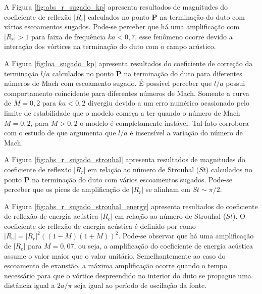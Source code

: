 \begin{figure}[ht!]
  \centering
  
\end{figure}

A Figura \ref{fig:abs_r_sugado_kp} apresenta resultados de magnitudes do coeficiente de reflexão $|R_{r}|$ calculados no ponto $\textbf{P}$ na terminação do duto com vários escoamentos sugados. Pode-se perceber que há uma amplificação com $|R_{r}| > 1$ para faixa de frequência $ka < 0,7$, esse fenômeno ocorre devido a interação dos vórtices na terminação do duto com o campo acústico.

A Figura \ref{fig:loa_sugado_kp} apresenta resultados do coeficiente de correção da terminação $l/a$ calculados no ponto $\textbf{P}$ na terminação do duto para diferentes números de Mach com escoamento sugado. É possível perceber que $l/a$ possui comportamento coincidente para diferentes números de Mach. Somente a curva de $M = 0,2$ para $ka < 0,2$ divergiu devido a um erro numérico ocasionado pelo limite de estabilidade que o modelo começa a ter quando o número de Mach $M = 0,2$, para $M > 0,2$ o modelo é completamente instável. Tal fato corrobora com o estudo de  que argumenta que $l/a$ é insensível a variação do número de Mach.  

\begin{figure}[ht!]
  \centering
  
\end{figure}

\begin{figure}[ht!]
\centering
  
\end{figure}

 A Figura \ref{fig:abs_r_sugado_strouhal} apresenta resultados de magnitudes do coeficiente de reflexão $|R_{r}|$ em relação ao número de Strouhal ($St$) calculados no ponto $\textbf{P}$ na terminação do duto com vários escoamentos sugados. Pode-se perceber que os picos de amplificação de $|R_{r}|$ se alinham em $St \sim \pi/2$.

A Figura \ref{fig:abs_r_sugado_strouhal_energy} apresenta resultados do coeficiente de reflexão de energia acústica $|R_{e}|$ em relação ao número de Strouhal ($St$). O coeficiente de reflexão de energia acústica é definido por  como $|R_{e}| = |R_{r}|^{2}((1 - M)(1 + M))^{2}$. Pode-se observar que há uma amplificação de $|R_{e}|$ para $M = 0,07$, ou seja, a amplificação do coeficiente de energia acústica assume o valor maior que o valor unitário. Semelhantemente ao caso do escoamento de exaustão, a máxima amplificação ocorre quando o tempo necessário para que o vórtice despreendido no interior do duto se propague uma distância igual a $2a/\pi$ seja igual ao período de oscilação da fonte. 

